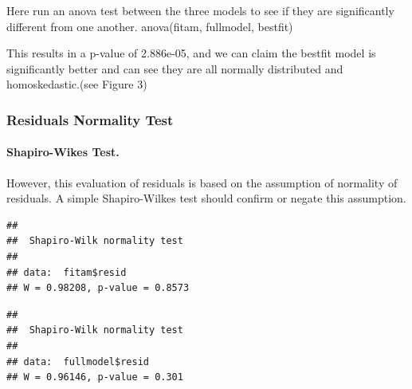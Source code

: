 \documentclass[]{article}
\newenvironment{Shaded}{\begin{snugshade}}{\end{snugshade}}
\newcommand{\KeywordTok}[1]{\textcolor[rgb]{0.13,0.29,0.53}{\textbf{#1}}}
\newcommand{\NormalTok}[1]{#1}
\newcommand{\OperatorTok}[1]{\textcolor[rgb]{0.81,0.36,0.00}{\textbf{#1}}}
\let\oldparagraph\paragraph
\renewcommand{\paragraph}[1]{\oldparagraph{#1}\mbox{}}
\begin{document}
Here run an anova test between the three models to see if they are
significantly different from one another. anova(fitam, fullmodel,
bestfit)

This results in a p-value of 2.886e-05, and we can claim the bestfit
model is significantly better and can see they are all normally
distributed and homoskedastic.(see Figure 3)

\hypertarget{residuals-normality-test}{%
\subsubsection{Residuals Normality
Test}\label{residuals-normality-test}}

\hypertarget{shapiro-wikes-test.}{%
\paragraph{Shapiro-Wikes Test.}\label{shapiro-wikes-test.}}

However, this evaluation of residuals is based on the assumption of
normality of residuals. A simple Shapiro-Wilkes test should confirm or
negate this assumption.

\begin{Shaded}
\end{Shaded}

\begin{verbatim}
## 
##  Shapiro-Wilk normality test
## 
## data:  fitam$resid
## W = 0.98208, p-value = 0.8573
\end{verbatim}

\begin{Shaded}
\end{Shaded}

\begin{verbatim}
## 
##  Shapiro-Wilk normality test
## 
## data:  fullmodel$resid
## W = 0.96146, p-value = 0.301
\end{verbatim}

\begin{Shaded}
\end{Shaded}
\end{document}
